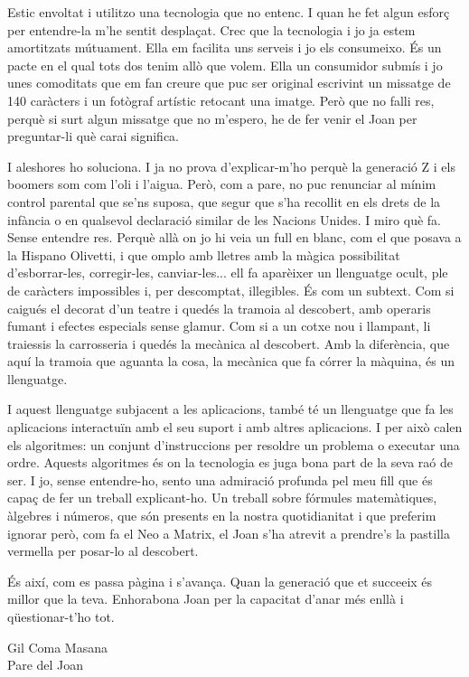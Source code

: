 Estic envoltat i utilitzo una tecnologia que no entenc. I quan he fet algun esforç per entendre-la m'he sentit desplaçat. Crec que la tecnologia i jo ja estem amortitzats mútuament. Ella em facilita uns serveis i jo els consumeixo. És un pacte en el qual tots dos tenim allò que volem. Ella un consumidor submís i jo unes comoditats que em fan creure que puc ser original escrivint un missatge de 140 caràcters i un fotògraf artístic retocant una imatge. Però que no falli res, perquè si surt algun missatge que no m'espero, he de fer venir el Joan per preguntar-li què carai significa.

I aleshores ho soluciona. I ja no prova d'explicar-m'ho perquè la generació Z i els boomers som com l'oli i l'aigua. Però, com a pare, no puc renunciar al mínim control parental que se'ns suposa, que segur que s'ha recollit en els drets de la infància o en qualsevol declaració similar de les Nacions Unides. I miro què fa. Sense entendre res. Perquè allà on jo hi veia un full en blanc, com el que posava a la Hispano Olivetti, i que omplo amb lletres amb la màgica possibilitat d'esborrar-les, corregir-les, canviar-les... ell fa aparèixer un llenguatge ocult, ple de caràcters impossibles i, per descomptat, illegibles. És com un subtext. Com si caigués el decorat d'un teatre i quedés la tramoia al descobert, amb operaris fumant i efectes especials sense glamur. Com si a un cotxe nou i llampant, li traiessis la carrosseria i quedés la mecànica al descobert. Amb la diferència, que aquí la tramoia que aguanta la cosa, la mecànica que fa córrer la màquina, és un llenguatge.

I aquest llenguatge subjacent a les aplicacions, també té un llenguatge que fa les aplicacions interactuïn amb el seu suport i amb altres aplicacions. I per això calen els algoritmes: un conjunt d'instruccions per resoldre un problema o executar una ordre. Aquests algoritmes és on la tecnologia es juga bona part de la seva raó de ser. I jo, sense entendre-ho, sento una admiració profunda pel meu fill que és capaç de fer un treball explicant-ho. Un treball sobre fórmules matemàtiques, àlgebres i números, que són presents en la nostra quotidianitat i que preferim ignorar però, com fa el Neo a Matrix, el Joan s'ha atrevit a prendre's la pastilla vermella per posar-lo al descobert. 

És així, com es passa pàgina i s'avança. Quan la generació que et succeeix és millor que la teva. Enhorabona Joan per la capacitat d'anar més enllà i qüestionar-t'ho tot.

\begin{flushright}
	Gil Coma Masana \\ Pare del Joan
\end{flushright}